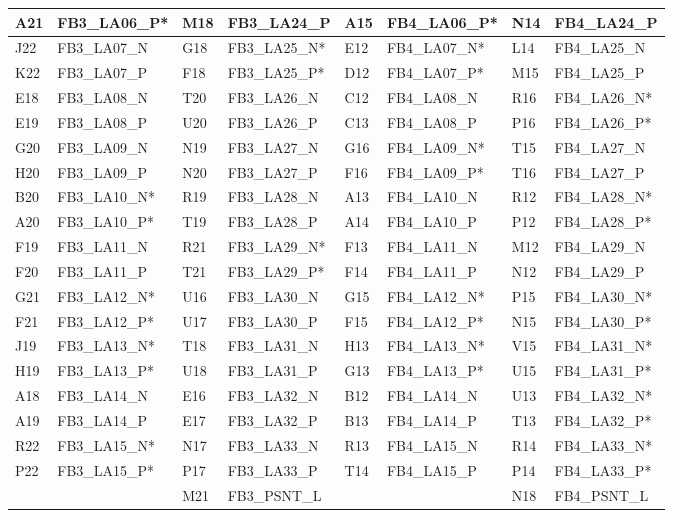\documentclass[letterpaper]{article}
\begin{document}
\begin{table}[htp]
\begin{tabular}{|l|l|l|l||l|l|l|l|}
A21 & FB3\_LA06\_P* & M18 & FB3\_LA24\_P & A15 & FB4\_LA06\_P* & N14 & FB4\_LA24\_P \\ \hline
J22 & FB3\_LA07\_N & G18 & FB3\_LA25\_N* & E12 & FB4\_LA07\_N* & L14 & FB4\_LA25\_N \\ \hline
K22 & FB3\_LA07\_P & F18 & FB3\_LA25\_P* & D12 & FB4\_LA07\_P* & M15 & FB4\_LA25\_P \\ \hline
E18 & FB3\_LA08\_N & T20 & FB3\_LA26\_N & C12 & FB4\_LA08\_N & R16 & FB4\_LA26\_N* \\ \hline
E19 & FB3\_LA08\_P & U20 & FB3\_LA26\_P & C13 & FB4\_LA08\_P & P16 & FB4\_LA26\_P* \\ \hline
G20 & FB3\_LA09\_N & N19 & FB3\_LA27\_N & G16 & FB4\_LA09\_N* & T15 & FB4\_LA27\_N \\ \hline
H20 & FB3\_LA09\_P & N20 & FB3\_LA27\_P & F16 & FB4\_LA09\_P* & T16 & FB4\_LA27\_P \\ \hline
B20 & FB3\_LA10\_N* & R19 & FB3\_LA28\_N & A13 & FB4\_LA10\_N & R12 & FB4\_LA28\_N* \\ \hline
A20 & FB3\_LA10\_P* & T19 & FB3\_LA28\_P & A14 & FB4\_LA10\_P & P12 & FB4\_LA28\_P* \\ \hline
F19 & FB3\_LA11\_N & R21 & FB3\_LA29\_N* & F13 & FB4\_LA11\_N & M12 & FB4\_LA29\_N \\ \hline
F20 & FB3\_LA11\_P & T21 & FB3\_LA29\_P* & F14 & FB4\_LA11\_P & N12 & FB4\_LA29\_P \\ \hline
G21 & FB3\_LA12\_N* & U16 & FB3\_LA30\_N & G15 & FB4\_LA12\_N* & P15 & FB4\_LA30\_N* \\ \hline
F21 & FB3\_LA12\_P* & U17 & FB3\_LA30\_P & F15 & FB4\_LA12\_P* & N15 & FB4\_LA30\_P* \\ \hline
J19 & FB3\_LA13\_N* & T18 & FB3\_LA31\_N & H13 & FB4\_LA13\_N* & V15 & FB4\_LA31\_N* \\ \hline
H19 & FB3\_LA13\_P* & U18 & FB3\_LA31\_P & G13 & FB4\_LA13\_P* & U15 & FB4\_LA31\_P* \\ \hline
A18 & FB3\_LA14\_N & E16 & FB3\_LA32\_N & B12 & FB4\_LA14\_N & U13 & FB4\_LA32\_N* \\ \hline
A19 & FB3\_LA14\_P & E17 & FB3\_LA32\_P & B13 & FB4\_LA14\_P & T13 & FB4\_LA32\_P* \\ \hline
R22 & FB3\_LA15\_N* & N17 & FB3\_LA33\_N & R13 & FB4\_LA15\_N & R14 & FB4\_LA33\_N* \\ \hline
P22 & FB3\_LA15\_P* & P17 & FB3\_LA33\_P & T14 & FB4\_LA15\_P & P14 & FB4\_LA33\_P* \\ \hline
    &            & M21 & FB3\_PSNT\_L &     &            & N18 & FB4\_PSNT\_L \\ \hline
\end{tabular}
\end{table}
\end{document}
